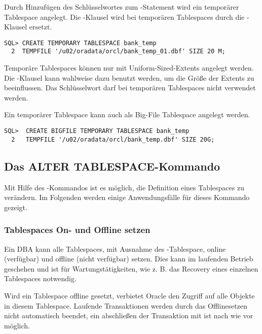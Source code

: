           Durch Hinzuf\"ugen des Schl\"usselwortes  zum -Statement wird ein tempor\"arer Tablespace angelegt. Die -Klausel wird bei tempor\"aren Tablespaces durch die -Klausel ersetzt.
          \begin{lstlisting}[caption={Einen tempor\"aren Tablespace anlegen},label=admin109,language=oracle_sql]
SQL> CREATE TEMPORARY TABLESPACE bank_temp
  2  TEMPFILE '/u02/oradata/orcl/bank_temp_01.dbf' SIZE 20 M;
          \end{lstlisting}
          \begin{merke}
            Tempor\"are Tablespaces k\"onnen nur mit Uniform-Sized-Extents angelegt werden. Die -Klausel kann wahlweise dazu benutzt werden, um die Gr\"o\ss{}e der Extents zu beeinflussen. Das Schl\"usselwort  darf bei tempor\"aren Tablespaces nicht verwendet werden.
          \end{merke}
          Ein tempor\"arer Tablespace kann auch als Big-File Tablespace angelegt werden.
          \begin{lstlisting}[caption={Einen tempor\"aren Big-File Tablespace anlegen},label=admin110,language=oracle_sql]
SQL>  CREATE BIGFILE TEMPORARY TABLESPACE bank_temp
  2   TEMPFILE '/u02/oradata/orcl/bank_temp.dbf' SIZE 20G;
          \end{lstlisting}
      \subsection{Das ALTER TABLESPACE-Kommando}
        Mit Hilfe des -Kommandos ist es m\"oglich, die Definition eines Tablespaces zu ver\"andern. Im Folgenden werden einige Anwendungsf\"alle f\"ur dieses Kommando gezeigt.
        \subsubsection{Tablespaces On- und Offline setzen}
          Ein DBA kann alle Tablespaces, mit Ausnahme des -Tablespace, online (verf\"ugbar) und offline (nicht verf\"ugbar) setzen. Dies kann im laufenden Betrieb geschehen und ist f\"ur Wartungst\"atigkeiten, wie z. B. das Recovery eines einzelnen Tablespaces notwendig.

          Wird ein Tablespace offline gesetzt, verbietet Oracle den Zugriff auf alle Objekte in diesem Tablespace. Laufende Transaktionen werden durch das Offlinesetzen nicht automatisch beendet, ein abschlie\ss{}en der Transaktion mit  ist nach wie vor m\"oglich.

